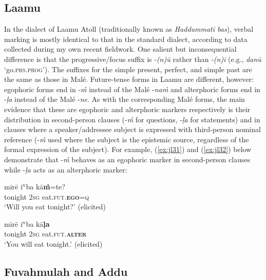 \documentclass[output=paper]{langsci/langscibook}
\begin{document}
\subsection{Laamu}\label{s:jl4-1}

In the dialect of Laamu Atoll (traditionally known as \textit{Haddummatī bas}), verbal marking is mostly identical to that in the standard dialect, according to data collected during my own recent fieldwork. One salient but inconsequential difference is that the progressive/focus suffix is ‑\textit{(n)ū} rather than ‑\textit{(n)ī} (e.g., \textit{danū} ‘go.\textsc{prs}.\textsc{prog}’). The suffixes for the simple present, perfect, and simple past are the same as those in Malé. Future-tense forms in Laamu are different, however: egophoric forms end in ‑\textit{m̊} instead of the Malé -\textit{nam̊} and alterphoric forms end in -\textit{ḷa} instead of the Malé -\textit{ne}. As with the corresponding Malé forms, the main evidence that these are egophoric and alterphoric markers respectively is their distribution in second-person clauses (‑\textit{m̊} for questions, ‑\textit{ḷa} for statements) and in clauses where a speaker/addressee subject is expressed with third-person nominal reference (-\textit{m̊} used where the subject is the epistemic source, regardless of the formal expression of the subject). For example, (\ref{ex:jl31}) and (\ref{ex:jl32}) below demonstrate that -\textit{m̊} behaves as an egophoric marker in second-person clauses while -\textit{ḷa} acts as an alterphoric marker:

\begin{exe}
	\ex 	\label{ex:jl31}
	\gll mirē i$^n$ba kā\textbf{m̊}=te?\\
	tonight 2\textsc{sg} eat.\textsc{fut}.\textbf{\textsc{ego}}=\textsc{q}\\
	\trans ‘Will you eat tonight?’ (elicited)
\end{exe}

\begin{exe}
	\ex 	\label{ex:jl32}
	\gll mirē i$^n$ba kā\textbf{ḷa}\\
	tonight 2\textsc{sg} eat.\textsc{fut}.\textbf{\textsc{alter}}\\
	\trans ‘You will eat tonight.’ (elicited)
\end{exe}

\subsection{Fuvahmulah and Addu}\label{s:jl4-2}
\end{document}
